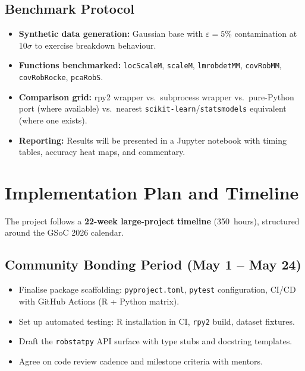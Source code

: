 \documentclass[11pt, a4paper]{article}
\begin{document}
\subsection{Benchmark Protocol}

\begin{itemize}[leftmargin=1.5em, itemsep=3pt]
  \item \textbf{Synthetic data generation:}
    Gaussian base with $\varepsilon = 5\%$ contamination at 10$\sigma$
    to exercise breakdown behaviour.
  \item \textbf{Functions benchmarked:}
    \texttt{locScaleM}, \texttt{scaleM}, \texttt{lmrobdetMM},
    \texttt{covRobMM}, \texttt{covRobRocke}, \texttt{pcaRobS}.
  \item \textbf{Comparison grid:}
    rpy2 wrapper vs.\ subprocess wrapper vs.\ pure-Python port (where
    available) vs.\ nearest \texttt{scikit-learn}/\texttt{statsmodels}
    equivalent (where one exists).
  \item \textbf{Reporting:}
    Results will be presented in a Jupyter notebook with timing tables,
    accuracy heat maps, and commentary.
\end{itemize}

\section{Implementation Plan and Timeline}

The project follows a \textbf{22-week large-project timeline}
(350~hours), structured around the GSoC 2026 calendar.

\subsection{Community Bonding Period (May 1 -- May 24)}

\begin{itemize}[leftmargin=1.5em, itemsep=2pt]
  \item Finalise package scaffolding: \texttt{pyproject.toml},
    \texttt{pytest} configuration, CI/CD with GitHub Actions
    (R + Python matrix).
  \item Set up automated testing: R installation in CI, \texttt{rpy2}
    build, dataset fixtures.
  \item Draft the \texttt{robstatpy} API surface with type stubs
    and docstring templates.
  \item Agree on code review cadence and milestone criteria with mentors.
\end{itemize}
\end{document}
